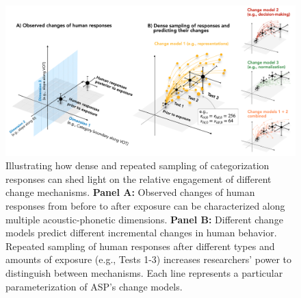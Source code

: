\documentclass[
  11pt,
  man,floatsintext]{apa6}
\begin{document}
\begin{figure}[h]
\begin{center}
\includegraphics[width=1 \columnwidth]{../figures/diagrams/repeated-sampling.png}
\caption{Illustrating how dense and repeated sampling of categorization responses can shed light on the relative engagement of different change mechanisms. {\bf Panel A:} Observed changes of human responses from before to after exposure can be characterized along multiple acoustic-phonetic dimensions. {\bf Panel B:} Different change models predict different incremental changes in human behavior. Repeated sampling of human responses after different types and amounts of exposure (e.g., Tests 1-3) increases researchers' power to distinguish between mechanisms. Each line represents a particular parameterization of ASP's change models.}\label{fig:repeated-sampling}
\end{center}
\end{figure}
\end{document}

